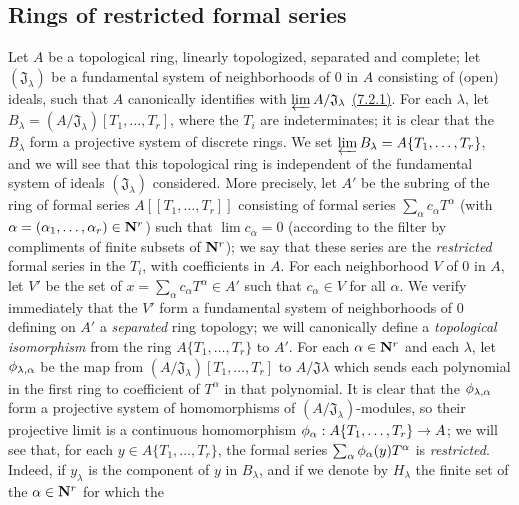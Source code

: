 \subsection{Rings of restricted formal series}
\label{subsection-rings-of-restricted-formal-series}

\begin{env}[7.5.1]
\label{0.7.5.1}
Let $A$ be a topological ring, linearly topologized, separated and complete; let
$(\mathfrak{J}_\lambda)$ be a fundamental system of neighborhoods of $0$ in $A$
consisting of (open) ideals, such that $A$ canonically identifies with
$\varprojlim A/\mathfrak{J}_\lambda$ \hyperref[0.7.2.1]{(7.2.1)}. For each
$\lambda$, let $B_\lambda=(A/\mathfrak{J}_\lambda)[T_1,\dots,T_r]$, where the
$T_i$ are indeterminates; it is clear that the $B_\lambda$ form a projective system
of discrete rings. We set $\varprojlim B_\lambda=A\{T_1,\dots,T_r\}$, and we will
see that this topological ring is independent of the fundamental system of ideals
$(\mathfrak{J}_\lambda)$ considered. More precisely, let $A'$ be the subring of the
ring of formal series $A[\![T_1,\dots,T_r]\!]$ consisting of formal series
$\sum_\alpha c_\alpha T^\alpha$ (with $\alpha=(\alpha_1,\dots,\alpha_r)\in\mathbf{N}^r$)
such that $\lim c_\alpha=0$ (according to the filter by compliments of finite subsets
of $\mathbf{N}^r$); we say that these series are the {\em restricted} formal series in the
$T_i$, with coefficients in $A$.
For each neighborhood $V$ of $0$ in $A$, let $V'$ be the set of
$x=\sum_\alpha c_\alpha T^\alpha\in A'$ such that $c_\alpha\in V$ for all $\alpha$.
We verify immediately that the $V'$ form a fundamental system of neighborhoods of $0$
defining on $A'$ a {\em separated} ring topology; we will canonically define a
{\em topological isomorphism} from the ring $A\{T_1,\dots,T_r\}$ to $A'$. For each
$\alpha\in\mathbf{N}^r$ and each $\lambda$, let $\phi_{\lambda,\alpha}$ be the map from
$(A/\mathfrak{J}_\lambda)[T_1,\dots,T_r]$ to $A/\mathfrak{J}\lambda$ which sends each
polynomial in the first ring to coefficient of $T^\alpha$ in that polynomial. It is
clear that the $\phi_{\lambda,\alpha}$ form a projective system of homomorphisms of
$(A/\mathfrak{J}_\lambda)$-modules, so their projective limit is a continuous
homomorphism $\phi_\alpha:A\{T_1,\dots,T_r\}\to A$; we will see that, for each
$y\in A\{T_1,\dots,T_r\}$, the formal series $\sum_\alpha\phi_\alpha(y)T^\alpha$ is
{\em restricted}. Indeed, if $y_\lambda$ is the component of $y$ in $B_\lambda$, and
if we denote by $H_\lambda$ the finite set of the $\alpha\in\mathbf{N}^r$ for which the

\end{env}
